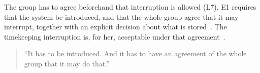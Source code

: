 The group has to agree beforehand that interruption is allowed (L7).
E1 requires that the system be introduced, and that the whole group agree that it may
interrupt, together with an explicit decision about what is stored~.
The timekeeping interruption is, for her, acceptable under that agreement~.
{\setlength{\topsep}{0.25\baselineskip}\setlength{\partopsep}{0pt}%
  \begin{quote}\small
    \enquote{It has to be introduced. And it has to have an agreement of the whole group that it
    may do that.}~
\end{quote}}
